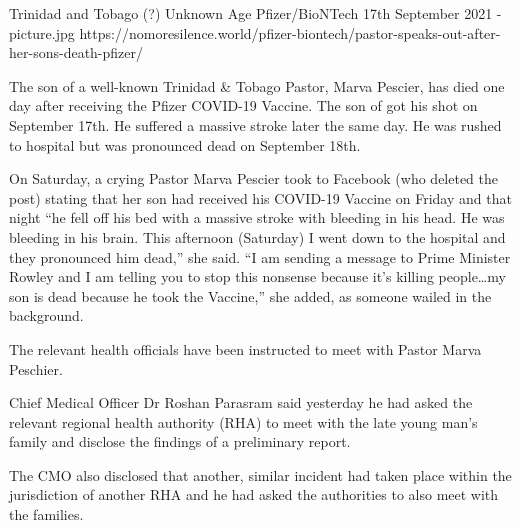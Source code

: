 {Trinidad and Tobago (?)}
{Unknown Age}
{Pfizer/BioNTech}
{17th September 2021}
{-}
{picture.jpg}
{https://nomoresilence.world/pfizer-biontech/pastor-speaks-out-after-her-sons-death-pfizer/}
{


The son of a well-known Trinidad \& Tobago Pastor, Marva Pescier, has died one day after receiving the Pfizer COVID-19 Vaccine. The son of got his shot on September 17th. He suffered a massive stroke later the same day. He was rushed to hospital but was pronounced dead on September 18th.

On Saturday, a crying Pastor Marva Pescier took to Facebook (who deleted the post) stating that her son had received his COVID-19 Vaccine on Friday and that night “he fell off his bed with a massive stroke with bleeding in his head. He was bleeding in his brain. This afternoon (Saturday) I went down to the hospital and they pronounced him dead,” she said. “I am sending a message to Prime Minister Rowley and I am telling you to stop this nonsense because it’s killing people…my son is dead because he took the Vaccine,” she added, as someone wailed in the background.

The relevant health officials have been instructed to meet with Pastor Marva Peschier.

Chief Medical Officer Dr Roshan Parasram said yesterday he had asked the relevant regional health authority (RHA) to meet with the late young man’s family and disclose the findings of a preliminary report.

The CMO also disclosed that another, similar incident had taken place within the jurisdiction of another RHA and he had asked the authorities to also meet with the families.
}
